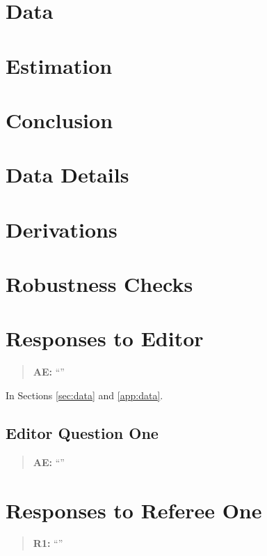 \documentclass[12pt,english]{article}
\begin{document}
\section{Data\label{sec:data}}
\Blindtext
\section{Estimation\label{sec:esti}}
\Blindtext
\section{Conclusion}
\blindtext

\pagebreak
\clearpage

\appendix

\setcounter{page}{1}

\section{Data Details\label{app:data}}
\blindtext
\section{Derivations}
\blindtext
\section{Robustness Checks}
\Blindtext
\pagebreak
\clearpage

\setcounter{section}{0}
\renewcommand{\thesection}{\arabic{section}}

\section{Responses to Editor}
\begin{quotation}
\textbf{AE: }\enquote{\blindtext}
\end{quotation}

In Sections \ref{sec:data} and \ref{app:data}. \blindtext

\subsection{Editor Question One}
\begin{quotation}
\textbf{AE: }\enquote{\blindtext}
\end{quotation}

\blindtext
\clearpage
\pagebreak

\section{Responses to Referee One}
\begin{quotation}
\textbf{R1: }\enquote{\blindtext}
\end{quotation}
\end{document}
